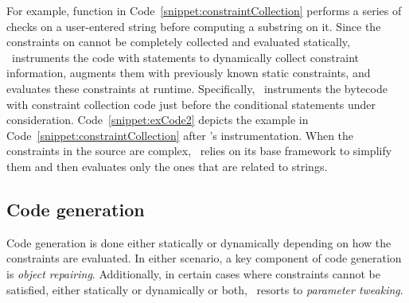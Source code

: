 \begin{mylist}
For example, function  in Code~\ref{snippet:constraintCollection}
performs a series of checks on a user-entered string  before computing
a substring on it. Since the constraints on  cannot be completely
collected and evaluated statically, \tool\ instruments the code with statements
to dynamically collect constraint information, augments them with previously
known static constraints, and evaluates these constraints at runtime.
Specifically, \tool\ instruments the bytecode with constraint collection code
just before the conditional statements under consideration.
Code~\ref{snippet:exCode2} depicts the example in
Code~\ref{snippet:constraintCollection} after \tool's instrumentation. When the
constraints in the source are complex, \tool\ relies on its base framework to
simplify them and then evaluates only the ones that are related to strings.


\end{mylist}

\subsection{Code generation}
\label{sec:tool:stage2:generation}

Code generation is done either statically or dynamically depending on how
the constraints are evaluated. In either scenario, a key component of code
generation is \textit{object repairing}. Additionally, in certain cases
where constraints cannot be satisfied, either statically or dynamically or
both, \tool\ resorts to \textit{parameter tweaking}.

